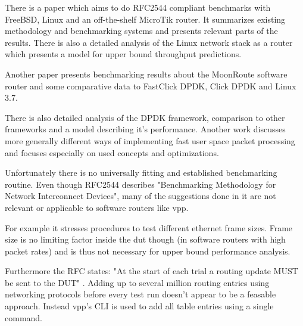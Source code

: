 There is a paper \cite{revisiting-benchmarking:1} which aims to do
RFC2544 compliant benchmarks with FreeBSD, Linux and an off-the-shelf
MicroTik router. It summarizes existing methodology and benchmarking
systems and presents relevant parts of the results. There is also a
detailed analysis \cite{raumer2015performance} of the Linux network
stack as a router which presents a model for upper bound throughput
predictions.

Another paper \cite{chair:architecture} presents benchmarking results
about the MoonRoute software router and some comparative data to
FastClick DPDK, Click DPDK and Linux 3.7.  

There is also detailed analysis of the DPDK framework, comparison to
other frameworks and a model describing it's performance. \cite
{compare-highperf} Another work discusses more generally different
ways of implementing fast user space packet processing and focuses
especially on used concepts and optimizations. \cite{barbette2015fast}


Unfortunately there is no universally fitting and established
benchmarking routine. Even though RFC2544 \cite{rfc2544} describes
"Benchmarking Methodology for Network Interconnect Devices", many of
the suggestions done in it are not relevant or applicable to software
routers like \Ac{vpp}. \cite{revisiting-benchmarking:1}



For example it stresses procedures to test different ethernet frame
sizes. Frame size is no limiting factor inside the \Ac{dut} though (in
software routers with high packet rates) and is thus not necessary for
upper bound performance analysis. \cite{emmerich2015assessing}


Furthermore the RFC states: "At the start of each trial a routing
update MUST be sent to the DUT" \cite{rfc2544}. Adding up to several
million routing entries using networking protocols before every test
run doesn't appear to be a feasable approach. Instead \Ac{vpp}'s CLI
is used to add all table entries using a single command.


